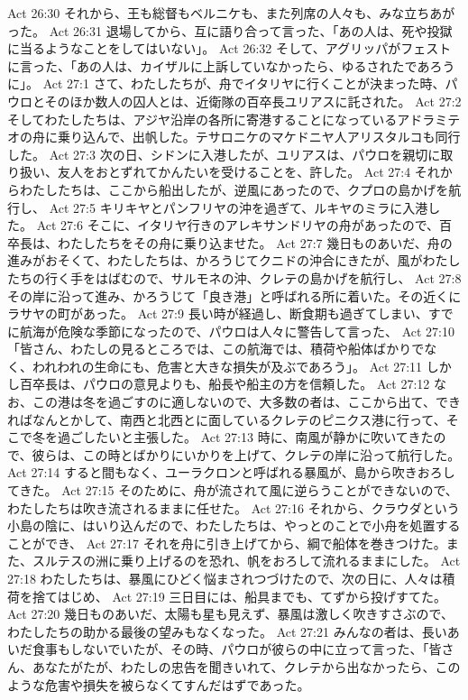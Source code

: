 Act 26:30  それから、王も総督もベルニケも、また列席の人々も、みな立ちあがった。
Act 26:31  退場してから、互に語り合って言った、「あの人は、死や投獄に当るようなことをしてはいない」。
Act 26:32  そして、アグリッパがフェストに言った、「あの人は、カイザルに上訴していなかったら、ゆるされたであろうに」。
Act 27:1  さて、わたしたちが、舟でイタリヤに行くことが決まった時、パウロとそのほか数人の囚人とは、近衛隊の百卒長ユリアスに託された。
Act 27:2  そしてわたしたちは、アジヤ沿岸の各所に寄港することになっているアドラミテオの舟に乗り込んで、出帆した。テサロニケのマケドニヤ人アリスタルコも同行した。
Act 27:3  次の日、シドンに入港したが、ユリアスは、パウロを親切に取り扱い、友人をおとずれてかんたいを受けることを、許した。
Act 27:4  それからわたしたちは、ここから船出したが、逆風にあったので、クプロの島かげを航行し、
Act 27:5  キリキヤとパンフリヤの沖を過ぎて、ルキヤのミラに入港した。
Act 27:6  そこに、イタリヤ行きのアレキサンドリヤの舟があったので、百卒長は、わたしたちをその舟に乗り込ませた。
Act 27:7  幾日ものあいだ、舟の進みがおそくて、わたしたちは、かろうじてクニドの沖合にきたが、風がわたしたちの行く手をはばむので、サルモネの沖、クレテの島かげを航行し、
Act 27:8  その岸に沿って進み、かろうじて「良き港」と呼ばれる所に着いた。その近くにラサヤの町があった。
Act 27:9  長い時が経過し、断食期も過ぎてしまい、すでに航海が危険な季節になったので、パウロは人々に警告して言った、
Act 27:10  「皆さん、わたしの見るところでは、この航海では、積荷や船体ばかりでなく、われわれの生命にも、危害と大きな損失が及ぶであろう」。
Act 27:11  しかし百卒長は、パウロの意見よりも、船長や船主の方を信頼した。
Act 27:12  なお、この港は冬を過ごすのに適しないので、大多数の者は、ここから出て、できればなんとかして、南西と北西とに面しているクレテのピニクス港に行って、そこで冬を過ごしたいと主張した。
Act 27:13  時に、南風が静かに吹いてきたので、彼らは、この時とばかりにいかりを上げて、クレテの岸に沿って航行した。
Act 27:14  すると間もなく、ユーラクロンと呼ばれる暴風が、島から吹きおろしてきた。
Act 27:15  そのために、舟が流されて風に逆らうことができないので、わたしたちは吹き流されるままに任せた。
Act 27:16  それから、クラウダという小島の陰に、はいり込んだので、わたしたちは、やっとのことで小舟を処置することができ、
Act 27:17  それを舟に引き上げてから、綱で船体を巻きつけた。また、スルテスの洲に乗り上げるのを恐れ、帆をおろして流れるままにした。
Act 27:18  わたしたちは、暴風にひどく悩まされつづけたので、次の日に、人々は積荷を捨てはじめ、
Act 27:19  三日目には、船具までも、てずから投げすてた。
Act 27:20  幾日ものあいだ、太陽も星も見えず、暴風は激しく吹きすさぶので、わたしたちの助かる最後の望みもなくなった。
Act 27:21  みんなの者は、長いあいだ食事もしないでいたが、その時、パウロが彼らの中に立って言った、「皆さん、あなたがたが、わたしの忠告を聞きいれて、クレテから出なかったら、このような危害や損失を被らなくてすんだはずであった。
